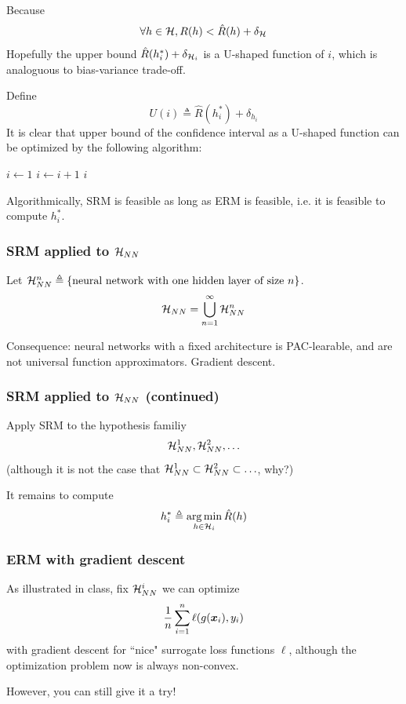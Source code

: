 \documentclass{article}
\DeclareMathOperator*{\argmin}{arg\,min}
\begin{document}
Because
\[
\forall h \in {\mathcal H}, R (h) < \hat{R} (h) + \delta_{\mathcal H}
\]
Hopefully the upper bound $\hat{R}(h_i^*) + \delta_{{\mathcal H}_i}$ is a U-shaped function of $i$, which is analoguous to bias-variance trade-off.

Define
\[
U(i) \triangleq \hat{R}(h_i^*) + \delta_{h_i}
\]
It is clear that upper bound of the confidence interval as a U-shaped function can be optimized by the following algorithm:
\begin{algorithmic}
\STATE $i \gets 1$
    \STATE $i \gets i + 1$
\ENDWHILE
\RETURN $i$
\end{algorithmic}

Algorithmically, SRM is feasible as long as ERM is feasible, i.e. it is feasible to compute $h_i^*$.

\subsubsection{SRM applied to ${\mathcal H}_{NN}$}

Let ${\mathcal H}_{NN}^n \triangleq \{\text{neural network with one hidden layer of size}\ n\}$.
\[
{\mathcal H}_{NN} = \bigcup_{n = 1}^\infty {\mathcal H}_{NN}^n
\]

Consequence: neural networks with a fixed architecture is PAC-learable, and are not universal function approximators.
Gradient descent.

\subsubsection{SRM applied to ${\mathcal H}_{NN}$ (continued)}

Apply SRM to the hypothesis familiy
\[
{\mathcal H}_{NN}^1, {\mathcal H}_{NN}^2, \ldots
\]
(although it is not the case that ${\mathcal H}_{NN}^1 \subset {\mathcal H}_{NN}^2 \subset \ldots$, why?)

It remains to compute
\[
h_i^* \triangleq \argmin_{h \in \calh_i} \hat{R} (h)
\]

\subsubsection{ERM with gradient descent}

As illustrated in class, fix ${\mathcal H}_{NN}^i$ we can optimize
\[
\frac1n \sum_{i = 1}^n \ell(g({\bm x}_i), y_i)
\]
with gradient descent for ``nice" surrogate loss functions $\ell$, although the optimization problem now is always non-convex.

However, you can still give it a try!
\end{document}
